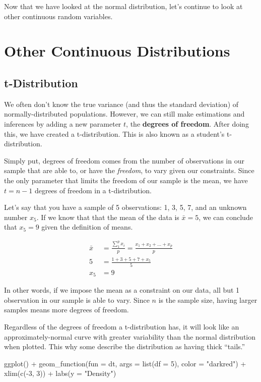 \documentclass[
]{article}
\newenvironment{Shaded}{\begin{snugshade}}{\end{snugshade}}
\newcommand{\AttributeTok}[1]{\textcolor[rgb]{0.77,0.63,0.00}{#1}}
\newcommand{\DecValTok}[1]{\textcolor[rgb]{0.00,0.00,0.81}{#1}}
\newcommand{\FunctionTok}[1]{\textcolor[rgb]{0.00,0.00,0.00}{#1}}
\newcommand{\NormalTok}[1]{#1}
\newcommand{\SpecialCharTok}[1]{\textcolor[rgb]{0.00,0.00,0.00}{#1}}
\newcommand{\StringTok}[1]{\textcolor[rgb]{0.31,0.60,0.02}{#1}}
\begin{document}
Now that we have looked at the normal distribution, let's continue to look at other continuous random variables.

\hypertarget{Continuous}{%
\section{Other Continuous Distributions}\label{Continuous}}

\hypertarget{T}{%
\subsection{t-Distribution}\label{T}}

We often don't know the true variance (and thus the standard deviation) of normally-distributed populations. However, we can still make estimations and inferences by adding a new parameter \(t\), the \textbf{degrees of freedom}. After doing this, we have created a t-distribution. This is also known as a student's t-distribution.

Simply put, degrees of freedom comes from the number of observations in our sample that are able to, or have the \emph{freedom}, to vary given our constraints. Since the only parameter that limits the freedom of our sample is the mean, we have \(t = n-1\) degrees of freedom in a t-distribution.

Let's say that you have a sample of 5 observations: 1, 3, 5, 7, and an unknown number \(x_5\). If we know that that the mean of the data is \(\bar{x}=5\), we can conclude that \(x_5=9\) given the definition of means.

\[\begin{split} \bar{x} &= \frac{\sum_{1}^p x_i}{p} = \frac{x_1+x_2+\ldots+x_p}{p} \\
5 &= \frac{1+3+5+7+x_5}{5} \\
x_5 &= 9
\end{split}\]

In other words, if we impose the mean as a constraint on our data, all but 1 observation in our sample is able to vary. Since \(n\) is the sample size, having larger samples means more degrees of freedom.

Regardless of the degrees of freedom a t-distribution has, it will look like an approximately-normal curve with greater variability than the normal distribution when plotted. This why some describe the distribution as having thick ``tails.''

\begin{Shaded}
\begin{Highlighting}[]
\FunctionTok{ggplot}\NormalTok{() }\SpecialCharTok{+}
  \FunctionTok{geom\_function}\NormalTok{(}\AttributeTok{fun =}\NormalTok{ dt, }\AttributeTok{args =} \FunctionTok{list}\NormalTok{(}\AttributeTok{df =} \DecValTok{5}\NormalTok{), }\AttributeTok{color =} \StringTok{"darkred"}\NormalTok{) }\SpecialCharTok{+}
  \FunctionTok{xlim}\NormalTok{(}\FunctionTok{c}\NormalTok{(}\SpecialCharTok{{-}}\DecValTok{3}\NormalTok{, }\DecValTok{3}\NormalTok{)) }\SpecialCharTok{+}
  \FunctionTok{labs}\NormalTok{(}\AttributeTok{y =} \StringTok{"Density"}\NormalTok{)}
\end{Highlighting}
\end{Shaded}
\end{document}
